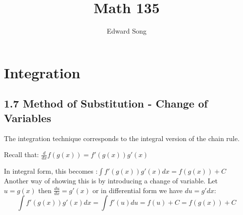 \documentclass[11pt]{article}
\title{Math 135}
\author{Edward Song}
\theoremstyle{plain}
\theoremstyle{remark}
\theoremstyle{plain}
\begin{document}
\section{Integration}


   

\subsection*{1.7 Method of Substitution - Change of Variables}

The integration technique corresponds to the integral version of the chain rule.

\begin{tcolorbox}[colback=red!5!white,colframe=red!75!black,title=Definition: Recall]
   Recall that: $\frac{d}{dx}f(g(x)) = f'(g(x))g'(x)$
\end{tcolorbox}   

In integral form, this becomes :$\int f'(g(x))g'(x)dx = f(g(x))+C$ \\

Another way of showing this is by introducing a change of variable. Let $u=g(x)$ then $\frac{du}{dx} =g'(x)$ or in differential form
we have $du=g'dx$:
\[ \int f'(g(x))g'(x)dx=\int f'(u)du = f(u) + C = f(g(x))+C\]
\end{document}
